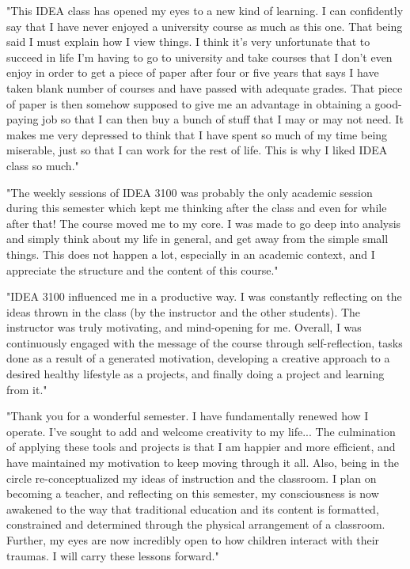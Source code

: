 \documentclass[letterpaper,10pt,headsepline]{scrreprt}
\begin{document}
"This IDEA class has opened my eyes to a new kind of learning. I can confidently say that I have never enjoyed a university course as much as this one. That being said I must explain how I view things. I think it’s very unfortunate that to succeed in life I’m having to go to university and take courses that I don’t even enjoy in order to get a piece of paper after four or five years that says I have taken blank number of courses and have passed with adequate grades. That piece of paper is then somehow supposed to give me an advantage in obtaining a good-paying job so that I can then buy a bunch of stuff that I may or may not need. It makes me very depressed to think that I have spent so much of my time being miserable, just so that I can work for the rest of life. This is why I liked IDEA class so much."
\vspace{2em}

"The weekly sessions of IDEA 3100 was probably the only academic session during this semester which kept me thinking after the class and even for while after that! The course moved me to my core. I was made to go deep into analysis and simply think about my life in general, and get away from the simple small things. This does not happen a lot, especially in an academic context, and I appreciate the structure and the content of this course."
\vspace{2em}

"IDEA 3100 influenced me in a productive way. I was constantly reflecting on the ideas thrown in the class (by the instructor and the other students). The instructor was truly motivating, and mind-opening for me. Overall, I was continuously engaged with the message of the course through self-reflection, tasks done as a result of a generated motivation, developing a creative approach to a desired healthy lifestyle as a projects, and finally doing a project and learning from it."
\vspace{2em}

"Thank you for a wonderful semester. I have fundamentally renewed how I operate. I’ve sought to add and welcome creativity to my life... The culmination of applying these tools and projects is that I am happier and more efficient, and have maintained my motivation to keep moving through it all. Also, being in the circle re-conceptualized my ideas of instruction and the classroom. I plan on becoming a teacher, and reflecting on this semester, my consciousness is now awakened to the way that traditional education and its content is formatted, constrained and determined through the physical arrangement of a classroom. Further, my eyes are now incredibly open to how children interact with their traumas. I will carry these lessons forward."
\vspace{2em}
\end{document}

